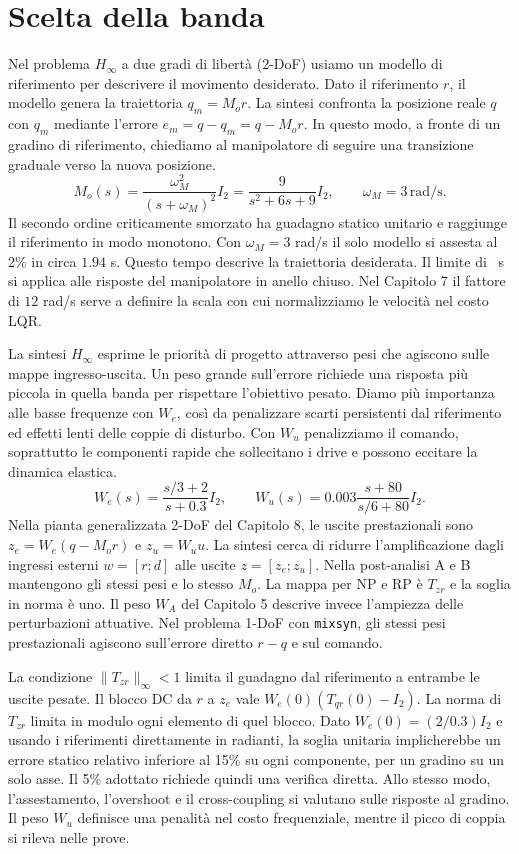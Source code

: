 \section{Scelta della banda}
Nel problema $H_\infty$ a due gradi di libertà (2-DoF) usiamo un
modello di riferimento per descrivere il movimento desiderato.
Dato il riferimento $r$, il modello genera la traiettoria $q_m=M_o r$.
La sintesi confronta la posizione reale $q$ con $q_m$ mediante
l'errore $e_m=q-q_m=q-M_or$. In questo modo, a fronte di un gradino
di riferimento, chiediamo al manipolatore di seguire una transizione
graduale verso la nuova posizione.
\[
 M_o(s)=\frac{\omega_M^2}{(s+\omega_M)^2}I_2
       =\frac{9}{s^2+6s+9}I_2,
 \qquad \omega_M=3\,\mathrm{rad/s}.
\]
Il secondo ordine criticamente smorzato ha guadagno statico unitario
e raggiunge il riferimento in modo monotono. Con $\omega_M=3$ rad/s
il solo modello si assesta al 2\% in circa $1.94$ s. Questo tempo
descrive la traiettoria desiderata. Il limite di \FinTsLimit\ s si
applica alle risposte del manipolatore in anello chiuso. Nel Capitolo 7 il fattore di $12$ rad/s
serve a definire la scala con cui normalizziamo le velocità nel costo LQR.

La sintesi $H_\infty$ esprime le priorità di progetto attraverso
pesi che agiscono sulle mappe ingresso-uscita. Un peso grande
sull'errore richiede una risposta più piccola in quella banda
per rispettare l'obiettivo pesato. Diamo più importanza alle basse
frequenze con $W_e$, così da penalizzare scarti persistenti dal
riferimento ed effetti lenti delle coppie di disturbo. Con $W_u$
penalizziamo il comando, soprattutto le componenti rapide che
sollecitano i drive e possono eccitare la dinamica elastica.
\[
 W_e(s)=\frac{s/3+2}{s+0.3}I_2,\qquad
 W_u(s)=0.003\frac{s+80}{s/6+80}I_2.
\]
Nella pianta generalizzata 2-DoF del Capitolo 8, le uscite
prestazionali sono $z_e=W_e(q-M_or)$ e $z_u=W_u u$. La sintesi
cerca di ridurre l'amplificazione dagli ingressi esterni
$w=[r;d]$ alle uscite $z=[z_e;z_u]$. Nella post-analisi A e B
mantengono gli stessi pesi e lo stesso $M_o$. La mappa per NP
e RP è $T_{zr}$ e la soglia in norma è uno. Il peso $W_A$
del Capitolo 5 descrive invece l'ampiezza delle perturbazioni
attuative. Nel problema 1-DoF con \texttt{mixsyn}, gli stessi
pesi prestazionali agiscono sull'errore diretto $r-q$ e sul comando.

La condizione $\|T_{zr}\|_\infty<1$ limita il guadagno dal
riferimento a entrambe le uscite pesate. Il blocco DC da $r$ a
$z_e$ vale $W_e(0)(T_{qr}(0)-I_2)$. La norma di $T_{zr}$ limita
in modulo ogni elemento di quel blocco.
Dato $W_e(0)=(2/0.3)I_2$ e usando i riferimenti direttamente in
radianti, la soglia unitaria implicherebbe un errore statico relativo
inferiore al 15\% su ogni componente, per un gradino su un solo asse.
Il 5\% adottato richiede quindi una verifica diretta. Allo stesso
modo, l'assestamento, l'overshoot e il cross-coupling si valutano
sulle risposte al gradino. Il peso $W_u$ definisce una penalità nel
costo frequenziale, mentre il picco di coppia si rileva nelle prove.

